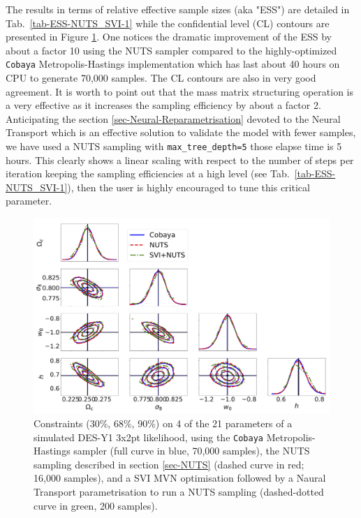 \documentclass[twocolumn,twocolappendix,nofootinbib]{openjournal}
\begin{document}
The results in terms of relative effective sample sizes (aka "ESS") are detailed in Tab.~\ref{tab-ESS-NUTS_SVI-1} while the confidential level (CL) contours are presented in Figure \ref{fig_cobaya_NUTS_SVI}. One notices the dramatic improvement of the ESS by about a factor 10 using the NUTS sampler compared to the highly-optimized \texttt{Cobaya}  Metropolis-Hastings implementation \citep{2019ascl.soft10019T,2021JCAP...05..057T} which has last about 40 hours on CPU to generate 70,000 samples. The CL contours are also in very good agreement. It is worth to point out that the mass matrix structuring operation is a very effective as it increases the sampling efficiency by about a factor 2.   Anticipating the section \ref{sec-Neural-Reparametrisation} devoted to the Neural Transport which is an effective solution to validate the model with fewer samples, we have used a NUTS sampling with \texttt{max\_tree\_depth=5} those elapse time is 5 hours. This clearly shows a linear scaling with respect to the number of steps per iteration keeping the sampling efficiencies at a high level (see Tab.~\ref{tab-ESS-NUTS_SVI-1}), then the user is highly encouraged to tune this critical parameter. 
%
\begin{figure}
\centering
\includegraphics[width=1.5\columnwidth]{figures/Cobaya-NUTS-SVI200.png}
\caption{Constraints (30\%, 68\%, 90\%) on 4 of the 21 parameters of a simulated DES-Y1 3x2pt likelihood, using the \texttt{Cobaya} Metropolis-Hastings sampler (full curve in blue, 70,000 samples), the  NUTS sampling described in section \ref{sec-NUTS} (dashed curve in red; 16,000 samples), and a SVI MVN optimisation followed by a Naural Transport parametrisation to run a NUTS sampling (dashed-dotted curve in green, 200 samples).}
\label{fig_cobaya_NUTS_SVI}
\end{figure}
\end{document}
